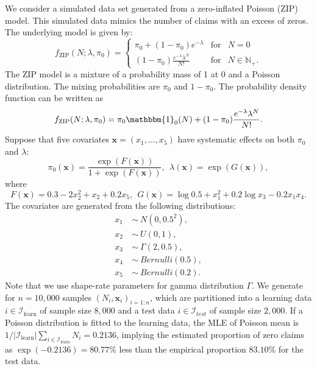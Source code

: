 \documentclass[11pt]{article}
\numberwithin{equation}{section}
\def\N{{\mathbb N}}  %
\def\bx{\boldsymbol{x}}
\begin{document}
We consider a simulated data set generated from a zero-inflated Poisson (ZIP) model. This simulated data mimics the number of claims with an excess of zeros.
The underlying  model is given by:
\begin{equation}
	f_{\text{ZIP}}(N;\lambda,\pi_0) = \left\{ 
	\begin{array}{ccl}
		\pi_0+(1-\pi_0)e^{-\lambda} & \mbox{for}
		& N=0 \\
		(1-\pi_0)\frac{e^{-\lambda}\lambda^N}{N!} & \mbox{for} &N\in\N_+.
	\end{array}\right.
\end{equation}
The ZIP model is a mixture of a probability mass of 1 at 0 and a Poisson distribution. The mixing probabilities are $\pi_0$ and $1-\pi_0$.
The probability density function can be written as
$$f_\text{ZIP}(N;\lambda,\pi_0)= \pi_0\mathbbm{1}_{0}(N) + 
(1-\pi_0)\frac{e^{-\lambda}\lambda^N}{N!}.$$
Suppose that five covariates $\bx=(x_1,\ldots,x_5)$ have systematic effects on both $\pi_0$ and $\lambda$:
\begin{equation}
	\pi_0(\bx)=\frac{\exp \left(F(\bx)\right)}{1+\exp\left( F(\bx)\right)}, ~~
	\lambda(\bx)=\exp\left( G(\bx)\right), 
\end{equation}
where
\begin{equation}
	F(\bx)=0.3-2x_2^2+x_2+0.2x_5, ~~G(\bx)=\log 0.5+x_1^2 + 0.2\log x_3 - 0.2x_1 x_4.
\end{equation}
The covariates are generated from the following distributions:
\begin{align*}
	x_1~&\sim~N(0,0.5^2),\\
	x_2~&\sim~U(0,1), \\
	x_3~&\sim~\Gamma(2,0.5), \\
	x_4~&\sim~Bernulli(0.5),\\
	x_5~&\sim~Bernulli(0.2).
\end{align*}
Note that we use shape-rate parameters for gamma distribution $\Gamma$.
We generate for $n=10,000$ samples $(N_i,\bx_i)_{i=1:n}$, which are partitioned into a learning data $i\in\mathcal{I}_\text{learn}$ of sample size $8,000$ and a test data $i\in\mathcal{I}_{test}$ of sample size $2,000$. 
If a Poisson distribution is fitted to the learning data, the MLE of Poisson mean is $1/|\mathcal{I}_\text{learn}|\sum_{i\in\mathcal{I}_\text{learn}}N_i=0.2136$, implying the estimated proportion of zero claims as $\exp(-0.2136)=80.77\%$ less than the empirical proportion $83.10\%$ for the test data. 
\end{document}
